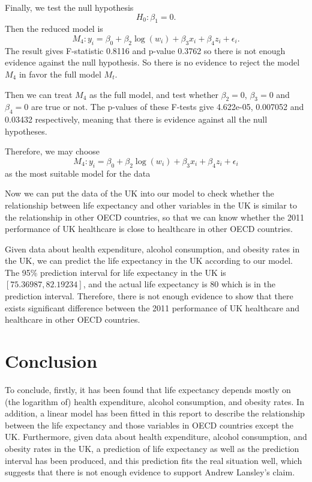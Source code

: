 \documentclass[
]{article}
\begin{document}
Finally, we test the null hypothesis \[H_0: \beta_1=0.\] Then the
reduced model is
\[M_4: y_i=\beta_0+\beta_2\log(w_i)+\beta_3x_i+\beta_4z_i+\epsilon_i.\]
The result gives F-statistic 0.8116 and p-value 0.3762 so there is not
enough evidence against the null hypothesis. So there is no evidence to
reject the model \(M_4\) in favor the full model \(M_t\).

Then we can treat \(M_4\) as the full model, and test whether
\(\beta_2=0\), \(\beta_3=0\) and \(\beta_4=0\) are true or not. The
p-values of these F-tests give 4.622e-05, 0.007052 and 0.03432
respectively, meaning that there is evidence against all the null
hypotheses.

Therefore, we may choose
\[M_4: y_i=\beta_0+\beta_2\log(w_i)+\beta_3x_i+\beta_4z_i+\epsilon_i\]
as the most suitable model for the data

Now we can put the data of the UK into our model to check whether the
relationship between life expectancy and other variables in the UK is
similar to the relationship in other OECD countries, so that we can know
whether the 2011 performance of UK healthcare is close to healthcare in
other OECD countries.

Given data about health expenditure, alcohol consumption, and obesity
rates in the UK, we can predict the life expectancy in the UK according
to our model. The 95\% prediction interval for life expectancy in the UK
is \([75.36987,82.19234]\), and the actual life expectancy is 80 which
is in the prediction interval. Therefore, there is not enough evidence
to show that there exists significant difference between the 2011
performance of UK healthcare and healthcare in other OECD countries.

\hypertarget{conclusion}{%
\section{Conclusion}\label{conclusion}}

To conclude, firstly, it has been found that life expectancy depends
mostly on (the logarithm of) health expenditure, alcohol consumption,
and obesity rates. In addition, a linear model has been fitted in this
report to describe the relationship between the life expectancy and
those variables in OECD countries except the UK. Furthermore, given data
about health expenditure, alcohol consumption, and obesity rates in the
UK, a prediction of life expectancy as well as the prediction interval
has been produced, and this prediction fits the real situation well,
which suggests that there is not enough evidence to support Andrew
Lansley's claim.
\end{document}
